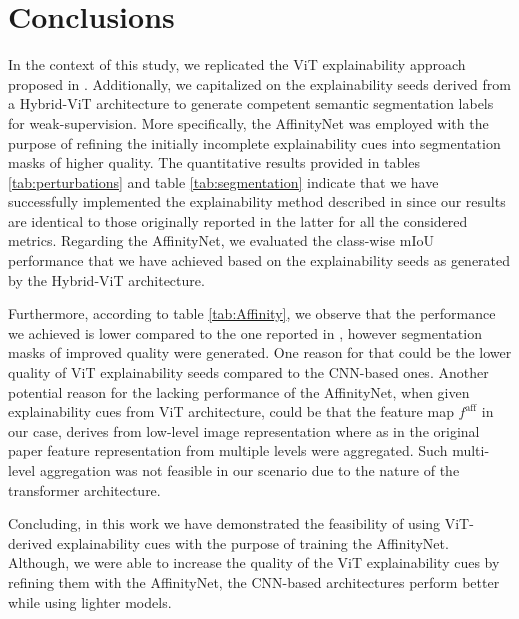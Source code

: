 \section{Conclusions}
In the context of this study, we replicated the ViT explainability approach proposed in \cite{mainpaper}. Additionally, we capitalized on the explainability seeds derived from a Hybrid-ViT architecture to generate competent semantic segmentation labels for weak-supervision. More specifically, the AffinityNet \cite{ahn2018learning} was employed with the purpose of refining the initially incomplete explainability cues into segmentation masks of higher quality. The quantitative results provided in tables \ref{tab:perturbations} and table \ref{tab:segmentation} indicate that we have successfully implemented the explainability method described in \cite{mainpaper} since our results are identical to those originally reported in the latter for all the considered metrics. Regarding the AffinityNet, we evaluated the class-wise mIoU performance that we have achieved based on the explainability seeds as generated by the Hybrid-ViT architecture. 

Furthermore, according to table \ref{tab:Affinity}, we observe that the performance we achieved is lower compared to the one reported in \cite{ahn2018learning}, however segmentation masks of improved quality were generated. One reason for that could be the lower quality of ViT explainability seeds compared to the CNN-based ones. Another potential reason for the lacking performance of the AffinityNet, when given explainability cues from ViT architecture, could be that the feature map $f^\text{aff}$ in our case, derives from low-level image representation where as in the original paper \cite{ahn2018learning} feature representation from multiple levels were aggregated. Such multi-level aggregation was not feasible in our scenario due to the nature of the transformer architecture.

Concluding, in this work we have demonstrated the feasibility of using ViT-derived explainability cues with the purpose of training the AffinityNet. Although, we were able to increase the quality of the ViT explainability cues by refining them with the AffinityNet, the CNN-based architectures perform better while using lighter models.

